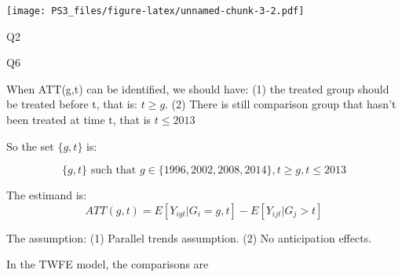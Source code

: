 \documentclass[
]{article}
\begin{document}
\texttt{[image: PS3\_files/figure-latex/unnamed-chunk-3-2.pdf]}

Q2

Q6

When ATT(g,t) can be identified, we should have: (1) the treated group
should be treated before t, that is: \(t \geq g\). (2) There is still
comparison group that hasn't been treated at time t, that is
\(t \leq 2013\)

So the set \(\{g,t\}\) is:

\[
\{ g, t \} \text{ such that } g \in \{1996, 2002, 2008, 2014\}, t \geq g, t \leq 2013
\]

The estimand is: \[
ATT(g,t) = E[Y_{igt} | G_i = g, t] - E[Y_{ijt} | G_j > t]
\]

The assumption: (1) Parallel trends assumption. (2) No anticipation
effects.

In the TWFE model, the comparisons are
\end{document}
